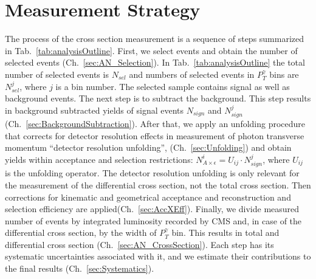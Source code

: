 \section{Measurement Strategy}
\label{sec:AN_WgMeasStrategy}

The process of the cross section measurement is a sequence of steps summarized in Tab.~\ref{tab:analysisOutline}. First, we select events and obtain the number of selected events (Ch.~\ref{sec:AN_Selection}). In Tab.~\ref{tab:analysisOutline} the total number of selected events is $N_{sel}$ and numbers of selected events in $P_T^{\gamma}$ bins are $N_{sel}^j$, where $j$ is a bin number. The selected sample contains signal as well as background events. The next step is to subtract the background. This step results in background subtracted yields of signal events $N_{sign}$ and $N_{sign}^j$ (Ch.~\ref{sec:BackgroundSubtraction}). After that, we apply an unfolding procedure that corrects for detector resolution effects in measurement of photon transverse momentum ``detector resolution unfolding'', (Ch.~\ref{sec:Unfolding}) and obtain yields within acceptance and selection restrictions: $N_{A\times\epsilon}^i = U_{ij} \cdot N_{sign}^j$, where $U_{ij}$ is the unfolding operator. The detector resolution unfolding is only relevant for the measurement of the differential cross section, not the total cross section. Then corrections for kinematic and geometrical acceptance and reconstruction and selection efficiency are applied(Ch.~\ref{sec:AccXEff}). Finally, we divide measured number of events by integrated luminosity recorded by CMS and, in case of the differential cross section, by the width of $P_T^{\gamma}$ bin. This results in total and differential cross section (Ch.~\ref{sec:AN_CrossSection}). Each step has its systematic uncertainties associated with it, and we estimate their contributions to the final results (Ch.~\ref{sec:Systematics}).

